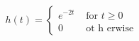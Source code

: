 \documentclass[preview]{standalone}
\begin{document}
\begin{align*}
{ h } (t) = \begin { cases }  e^ { -2t }  & \text { for  }  t \geq 0 \\ 0 & \text { ot h erwise }  \end { cases }
\end{align*}
\end{document}
